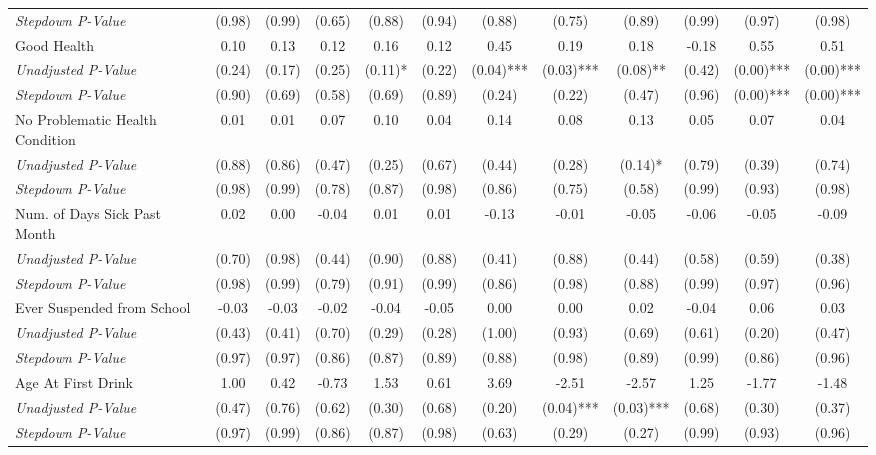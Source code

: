 \begin{tabular}{l c c c c c c c c c c c}
\quad \textit{Stepdown P-Value} & (0.98) & (0.99) & (0.65) & (0.88) & (0.94) & (0.88) & (0.75) & (0.89) & (0.99) & (0.97) & (0.98) \\
Good Health & 0.10 & 0.13 & 0.12 & 0.16 & 0.12 & 0.45 & 0.19 & 0.18 & -0.18 & 0.55 & 0.51 \\
\quad \textit{Unadjusted P-Value} & (0.24) & (0.17) & (0.25) & (0.11)* & (0.22) & (0.04)*** & (0.03)*** & (0.08)** & (0.42) & (0.00)*** & (0.00)*** \\
\quad \textit{Stepdown P-Value} & (0.90) & (0.69) & (0.58) & (0.69) & (0.89) & (0.24) & (0.22) & (0.47) & (0.96) & (0.00)*** & (0.00)*** \\
No Problematic Health Condition & 0.01 & 0.01 & 0.07 & 0.10 & 0.04 & 0.14 & 0.08 & 0.13 & 0.05 & 0.07 & 0.04 \\
\quad \textit{Unadjusted P-Value} & (0.88) & (0.86) & (0.47) & (0.25) & (0.67) & (0.44) & (0.28) & (0.14)* & (0.79) & (0.39) & (0.74) \\
\quad \textit{Stepdown P-Value} & (0.98) & (0.99) & (0.78) & (0.87) & (0.98) & (0.86) & (0.75) & (0.58) & (0.99) & (0.93) & (0.98) \\
Num. of Days Sick Past Month & 0.02 & 0.00 & -0.04 & 0.01 & 0.01 & -0.13 & -0.01 & -0.05 & -0.06 & -0.05 & -0.09 \\
\quad \textit{Unadjusted P-Value} & (0.70) & (0.98) & (0.44) & (0.90) & (0.88) & (0.41) & (0.88) & (0.44) & (0.58) & (0.59) & (0.38) \\
\quad \textit{Stepdown P-Value} & (0.98) & (0.99) & (0.79) & (0.91) & (0.99) & (0.86) & (0.98) & (0.88) & (0.99) & (0.97) & (0.96) \\
Ever Suspended from School & -0.03 & -0.03 & -0.02 & -0.04 & -0.05 & 0.00 & 0.00 & 0.02 & -0.04 & 0.06 & 0.03 \\
\quad \textit{Unadjusted P-Value} & (0.43) & (0.41) & (0.70) & (0.29) & (0.28) & (1.00) & (0.93) & (0.69) & (0.61) & (0.20) & (0.47) \\
\quad \textit{Stepdown P-Value} & (0.97) & (0.97) & (0.86) & (0.87) & (0.89) & (0.88) & (0.98) & (0.89) & (0.99) & (0.86) & (0.96) \\
Age At First Drink & 1.00 & 0.42 & -0.73 & 1.53 & 0.61 & 3.69 & -2.51 & -2.57 & 1.25 & -1.77 & -1.48 \\
\quad \textit{Unadjusted P-Value} & (0.47) & (0.76) & (0.62) & (0.30) & (0.68) & (0.20) & (0.04)*** & (0.03)*** & (0.68) & (0.30) & (0.37) \\
\quad \textit{Stepdown P-Value} & (0.97) & (0.99) & (0.86) & (0.87) & (0.98) & (0.63) & (0.29) & (0.27) & (0.99) & (0.93) & (0.96) \\
\bottomrule
\end{tabular}
